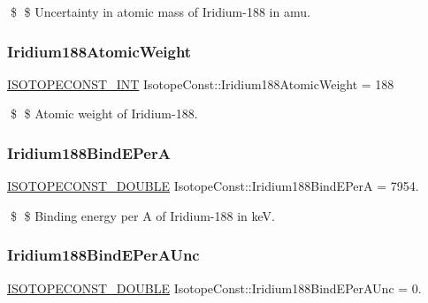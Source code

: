\$ \$ Uncertainty in atomic mass of Iridium-\/188 in amu. \mbox{\label{group___isotope_const-_iridium-_ir188_ga0ebd0cb43382ccb1c8245e1fdaa62bdb}} 
\subsubsection{\texorpdfstring{Iridium188\+Atomic\+Weight}{Iridium188AtomicWeight}}
{\footnotesize\ttfamily \mbox{\hyperlink{group___isotope_const-_macros_ga5f18360b3e99483a35c32d789e62621c}{I\+S\+O\+T\+O\+P\+E\+C\+O\+N\+S\+T\+\_\+\+I\+NT}} Isotope\+Const\+::\+Iridium188\+Atomic\+Weight = 188}

\$ \$ Atomic weight of Iridium-\/188. \mbox{\label{group___isotope_const-_iridium-_ir188_ga3161c51ece1c4c07c3c2fae773434cae}} 
\subsubsection{\texorpdfstring{Iridium188\+Bind\+E\+PerA}{Iridium188BindEPerA}}
{\footnotesize\ttfamily \mbox{\hyperlink{group___isotope_const-_macros_ga8f45a7272ce02c0b4c65c44636ed719a}{I\+S\+O\+T\+O\+P\+E\+C\+O\+N\+S\+T\+\_\+\+D\+O\+U\+B\+LE}} Isotope\+Const\+::\+Iridium188\+Bind\+E\+PerA = 7954.}

\$ \$ Binding energy per A of Iridium-\/188 in keV. \mbox{\label{group___isotope_const-_iridium-_ir188_ga4b97768a1ce28c4c35a03909eb9554b0}} 
\subsubsection{\texorpdfstring{Iridium188\+Bind\+E\+Per\+A\+Unc}{Iridium188BindEPerAUnc}}
{\footnotesize\ttfamily \mbox{\hyperlink{group___isotope_const-_macros_ga8f45a7272ce02c0b4c65c44636ed719a}{I\+S\+O\+T\+O\+P\+E\+C\+O\+N\+S\+T\+\_\+\+D\+O\+U\+B\+LE}} Isotope\+Const\+::\+Iridium188\+Bind\+E\+Per\+A\+Unc = 0.}

